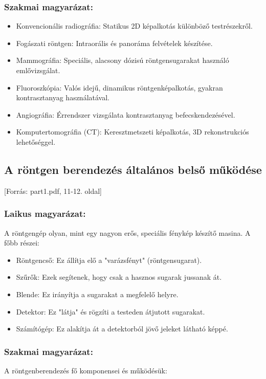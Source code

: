 \documentclass[a4paper,12pt]{article}
\begin{document}
\subsubsection{Szakmai magyarázat:} \begin{itemize} \item Konvencionális radiográfia: Statikus 2D képalkotás különböző testrészekről. \item Fogászati röntgen: Intraorális és panoráma felvételek készítése. \item Mammográfia: Speciális, alacsony dózisú röntgensugarakat használó emlővizsgálat. \item Fluoroszkópia: Valós idejű, dinamikus röntgenképalkotás, gyakran kontrasztanyag használatával. \item Angiográfia: Érrendszer vizsgálata kontrasztanyag befecskendezésével. \item Komputertomográfia (CT): Keresztmetszeti képalkotás, 3D rekonstrukciós lehetőséggel. \end{itemize}


\subsection{A röntgen berendezés általános belső működése} [Forrás: part1.pdf, 11-12. oldal]

\subsubsection{Laikus magyarázat:} A röntgengép olyan, mint egy nagyon erős, speciális fénykép készítő masina. A főbb részei:

\begin{itemize} \item Röntgencső: Ez állítja elő a "varázsfényt" (röntgensugarat). \item Szűrők: Ezek segítenek, hogy csak a hasznos sugarak jussanak át. \item Blende: Ez irányítja a sugarakat a megfelelő helyre. \item Detektor: Ez "látja" és rögzíti a testeden átjutott sugarakat. \item Számítógép: Ez alakítja át a detektorból jövő jeleket látható képpé. \end{itemize}

\subsubsection{Szakmai magyarázat:} A röntgenberendezés fő komponensei és működésük:
\end{document}
